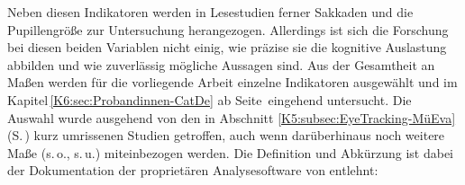 Neben diesen Indikatoren werden in Lesestudien ferner Sakkaden und die Pupillengröße zur Untersuchung herangezogen. Allerdings ist sich die Forschung bei diesen beiden Variablen nicht einig, wie präzise sie die kognitive Auslastung abbilden und wie zuverlässig mögliche Aussagen sind. Aus der Gesamtheit an Maßen werden für die vorliegende Arbeit einzelne Indikatoren ausgewählt und im Kapitel\,\ref{K6:sec:Probandinnen-CatDe} ab Seite\,\pageref{K6:sec:Probandinnen-CatDe} eingehend untersucht. Die Auswahl wurde ausgehend von den in Abschnitt \ref{K5:subsec:EyeTracking-MüEva} (S.\,\pageref{K5:subsec:EyeTracking-MüEva}) kurz umrissenen Studien getroffen, auch wenn darüberhinaus noch weitere Maße (s.\,o., s.\,u.) miteinbezogen werden. Die Definition und Abkürzung ist dabei der Dokumentation der proprietären Analysesoftware von \citet[]{sr_research_ltd_eyelink_2019} entlehnt:

